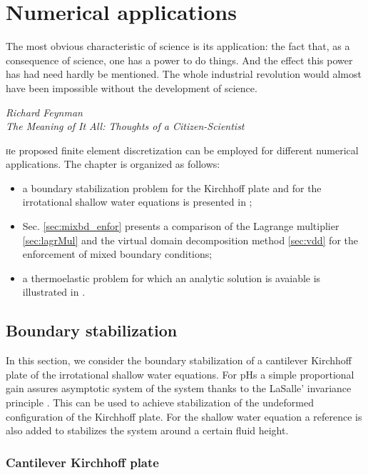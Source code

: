 \chapter{Numerical applications}\label{ch:applications}

\epigraph{The most obvious characteristic of science is its application: the fact that, as a consequence of science, one has a power to do things. And the effect this power has had need hardly be mentioned. The whole industrial revolution would almost have been impossible without the development of science.}{\textit{Richard Feynman \\ The Meaning of It All: Thoughts of a Citizen-Scientist}}
\minitoc

\lettrine{\color{theme}{T}}he proposed finite element discretization can be employed for different numerical applications. The chapter is organized as follows:
\begin{itemize}
	\item a boundary stabilization problem for the Kirchhoff plate and for the irrotational shallow water equations is presented in ;
	\item Sec. \ref{sec:mixbd_enfor} presents a comparison of the Lagrange multiplier \ref{sec:lagrMul} and the virtual domain decomposition method \ref{sec:vdd} for the enforcement of mixed boundary conditions;
	\item a thermoelastic problem for which an analytic solution is avaiable is illustrated in .
\end{itemize}



\section{Boundary stabilization}\label{sec:bd_stab}

In this section, we consider the boundary stabilization of a cantilever Kirchhoff plate of the irrotational shallow water equations. For pHs a simple proportional gain assures asymptotic system of the system thanks to the LaSalle’ invariance principle \cite[chapter
6, proposition 6.2]{duindam2009}. This can be used to achieve stabilization of the undeformed configuration of the Kirchhoff plate. For the shallow water equation a reference is also added to stabilizes the system around a certain fluid height.


\subsection{Cantilever Kirchhoff plate}

